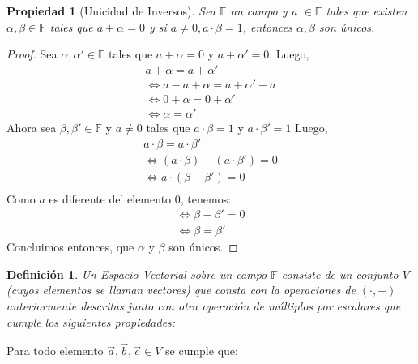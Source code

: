 \documentclass[10pt,a4paper]{article}
\newtheorem{mydef}{Definición}
\newtheorem{prop}{Propiedad}
\begin{document}
\begin{prop}[Unicidad de Inversos] Sea $\mathbb{F}$ un campo y a $\in \mathbb{F}$ tales que existen $ \alpha,\beta \in \mathbb{F}$ tales que  $a+\alpha=0$ y si $a \neq 0, a \cdot \beta = 1 $, entonces $\alpha,\beta$ son únicos.
\end{prop}

\begin{proof}

Sea $\alpha, \alpha' \in \mathbb{F}$ tales que $a+\alpha=0$ y $a+\alpha'=0$, 
Luego,
\begin{align*}
a+\alpha= a+\alpha' \\
\Leftrightarrow a-a+\alpha = a+\alpha'-a \\
\Leftrightarrow 0+\alpha = 0+\alpha' \\
\Leftrightarrow \alpha = \alpha'
\end{align*}
Ahora sea $\beta, \beta' \in \mathbb{F}$ y  $a \neq 0$  tales que $a \cdot \beta = 1 $ y  $a \cdot \beta' = 1 $
Luego,
\begin{align*}
 a \cdot \beta = a \cdot \beta' \\
 \Leftrightarrow (a \cdot \beta)-(a \cdot \beta')=0 \\
 \Leftrightarrow a \cdot(\beta - \beta')=0 \\
\end{align*}
Como $a$ es diferente del elemento $0$, tenemos:
\begin{align*}
\Leftrightarrow \beta - \beta' = 0 \\
\Leftrightarrow \beta = \beta'
\end{align*}
Concluimos entonces, que $ \alpha $ y $ \beta $ son únicos. 

\end{proof}



\begin{mydef} Un \textit{Espacio Vectorial} sobre un campo $\mathbb{F}$ consiste de un conjunto $V$ (cuyos elementos se llaman vectores)  que consta con la operaciones de $(\cdot, +)$ anteriormente descritas junto con otra operación de múltiplos por escalares que cumple los siguientes propiedades: 
\end{mydef}

Para todo elemento $\vec{a},\vec{b},\vec{c} \in V$ se cumple que:
\end{document}
